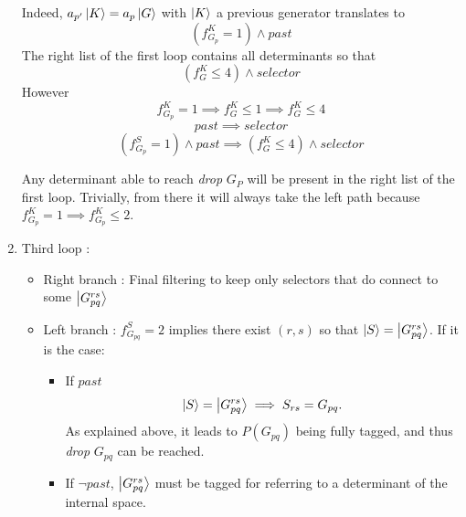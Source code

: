 \documentclass[./thesis.tex]{subfiles}
\newcommand{\Gpqrs}{\ket{G^{rs}_{pq}}}
\begin{document}
\begin{enumerate}
Indeed, $a_{p'} \ket K = a_p \ket G$ with $\ket K$ a previous generator translates to
\begin{equation}
(f^K_{G_{p}} = 1) \wedge past
\end{equation}
The right list of the first loop contains all determinants so that
\begin{equation}
(f^K_G \leq 4) \wedge selector
\end{equation}
However 
\begin{equation}
f^K_{G_{p}} = 1 \implies f^K_G \leq 1 \implies f^K_G \leq 4
\end{equation}
\begin{equation}
past \implies selector
\end{equation}
\begin{equation}
(f^S_{G_{p}} = 1) \wedge past \implies (f^K_G \leq 4) \wedge selector
\end{equation}

Any determinant able to reach \emph{drop} $G_P$ will be present in the right list of the first loop. Trivially, from there it will always take the left path because $f^K_{G_{p}} = 1 \implies f^K_{G_{p}} \leq 2$.

\item
Third loop :
\begin{itemize}

\item
Right branch :
Final filtering to keep only selectors that do connect to some $\Gpqrs$
\item
Left branch : $f_{G_{pq}}^S = 2$ implies there exist $(r,s)$ so that $\ket S=\Gpqrs$. If it is the case:
\begin{itemize}
\item
If $past$
\begin{equation}
\ket S=\ket {G_{pq}^{rs}} \implies S_{rs} = G_{pq}.
\end{equation}
As explained above, it leads to $P(G_{pq})$ being fully tagged, and thus \emph{drop} $G_{pq}$ can be reached.
\item
If $\neg past$, $\ket {G_{pq}^{rs}}$ must be tagged for referring to a determinant of the internal space.
\end{itemize}



\end{itemize}

\end{enumerate}



\newcommand{\Gpq}{\ket {G_{pq}}}
\newcommand{\Gpbq}{\ket {G_{p \bar q}}}
\end{document}
